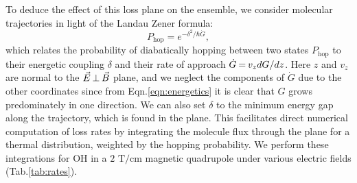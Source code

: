 \documentclass[%
 reprint,
 amsmath,amssymb,
 aps,
prl,
]{revtex4-1}
\newcommand{\epb}{{$\vec{E}\s {\perp}\s\vec{B}$}}
\newcommand{\s}{{\nobreak\hspace{.2em}}}
\begin{document}
To deduce the effect of this loss plane on the ensemble, we consider molecular trajectories in light of the Landau Zener formula:
\begin{equation}
\label{eqn:lz}
P_\text{hop}=e^{-\delta^2/\hbar\dot{G}},
\end{equation}
which relates the probability of diabatically hopping between two states $P_\text{hop}$ to their energetic coupling $\delta$ and their rate of approach $\dot{G}\s {=}\s v_zdG/dz$. 
Here $z$ and $v_z$ are normal to the \epb{} plane, and we neglect the components of $\dot{G}$ due to the other coordinates since from Eqn.\s\ref{eqn:energetics} it is clear that $G$ grows predominately in one direction.
We can also set $\delta$ to the minimum energy gap along the trajectory, which is found in the plane.
This facilitates direct numerical computation of loss rates by integrating the molecule flux through the plane for a thermal distribution, weighted by the hopping probability.
We perform these integrations for OH in a $2\text{ T/cm}$ magnetic quadrupole\s\cite{Sawyer2008} under various electric fields (Tab.\s\ref{tab:rates}).
\end{document}
